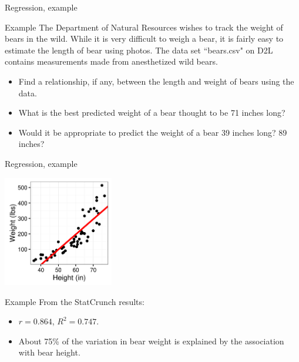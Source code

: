 \documentclass[xcolor=table]{beamer}
\begin{document}
\begin{frame}{Regression, example}
\begin{exampleblock}{Example}
\large
The Department of Natural Resources wishes to track the weight of bears in the wild. While it is very difficult to weigh a bear, it is fairly easy to estimate the length of bear using photos. The data set ``bears.csv" on D2L contains measurements made from anesthetized wild bears.\\
\begin{itemize}
\item Find a relationship, if any, between the length and weight of bears using the data.
\item What is the best predicted weight of a bear thought to be 71 inches long?
\item Would it be appropriate to predict the weight of a bear 39 inches long? 89 inches?
\end{itemize}
\end{exampleblock}
\end{frame}

\begin{frame}{Regression, example}

\smallskip
{\centering
\includegraphics[width=1.9in]{../images/ch10_reg_bears}
\par}

\pause
\begin{exampleblock}{Example}
\large
From the StatCrunch results:
\begin{itemize}
\item $r = 0.864$, $R^2 = 0.747$.
\item About 75\% of the variation in bear weight is explained by the association with bear height.
\end{itemize}
\end{exampleblock}

\end{frame}
\end{document}
